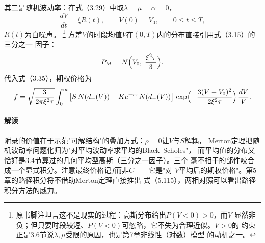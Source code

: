 其二是随机波动率：在式（3.29）中取$\lambda=\mu=\alpha=0$，
\begin{equation*}
\frac{dV}{dt}=\xi R(t),\qquad V(0)=V_{0},\qquad 0\leq t\leq T,
\end{equation*}
$R(t)$为白噪声。
\footnote{原书脚注坦言这不是现实的过程：高斯分布给出$P(V<0)>0$，而$V$
显然非负；但只要时段较短、$P(V<0)$可忽略，它不失为合理近似。$V>0$的
约束正是3.6节说$\lambda,\mu$受限的原因，也是第7章非线性（对数）模型
的动机之一。}
方差$V$的时段均值$\bar V$在$(0,T)$内的分布直接引用式（3.15）的三分之一
因子：
\begin{equation*}
P_{M}=N\Bigl(V_{0},\;\frac{\xi^{2}\tau}{3}\Bigr).
\end{equation*}
代入式（3.35），期权价格为
\begin{equation*}
f=\sqrt{\frac{3}{2\pi\xi^{2}\tau}}
\int_{0}^{\infty}\bigl[S\,N(d_{+}(V))-Ke^{-r\tau}N(d_{-}(V))\bigr]\,
\exp\Bigl(-\frac{3(V-V_{0})^{2}}{2\xi^{2}\tau}\Bigr)\,\frac{dV}{V}.
\end{equation*}

\paragraph{解读}
附录的价值在于示范"可解结构"的叠加方式：$\rho=0$让$V$与$S$解耦，
Merton定理把随机波动率问题化归为"对平均波动率求平均的Black--Scholes"，
而平均值的分布又恰好是3.4节算过的几何平均型高斯（三分之一因子）。三个
毫不相干的部件咬合成一个显式积分。注意最终价格记$f$而非$C$——它是"对
$\bar V$平均后的期权价格"。第5章的路径积分将不借助Merton定理直接推出
式（5.115），两相对照可以看出路径积分方法的威力。


